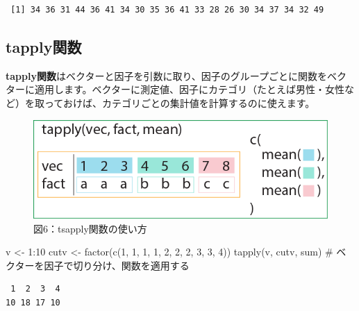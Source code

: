 \documentclass[
  letterpaper,
  DIV=11,
  numbers=noendperiod]{scrreprt}
\newenvironment{Shaded}{\begin{snugshade}}{\end{snugshade}}
\newcommand{\CommentTok}[1]{\textcolor[rgb]{0.37,0.37,0.37}{#1}}
\newcommand{\DecValTok}[1]{\textcolor[rgb]{0.68,0.00,0.00}{#1}}
\newcommand{\FunctionTok}[1]{\textcolor[rgb]{0.28,0.35,0.67}{#1}}
\newcommand{\NormalTok}[1]{\textcolor[rgb]{0.00,0.23,0.31}{#1}}
\newcommand{\OtherTok}[1]{\textcolor[rgb]{0.00,0.23,0.31}{#1}}
\newcommand{\SpecialCharTok}[1]{\textcolor[rgb]{0.37,0.37,0.37}{#1}}
\begin{document}
\begin{verbatim}
 [1] 34 36 31 44 36 41 34 30 35 36 41 33 28 26 30 34 37 34 32 49
\end{verbatim}

\hypertarget{tapplyux95a2ux6570}{%
\subsection{tapply関数}\label{tapplyux95a2ux6570}}

\textbf{tapply関数}はベクターと因子を引数に取り、因子のグループごとに関数をベクターに適用します。ベクターに測定値、因子にカテゴリ（たとえば男性・女性など）を取っておけば、カテゴリごとの集計値を計算するのに使えます。

\begin{figure}

{\centering \includegraphics{././image/chapter15_tapply.png}

}

\caption{図6：tsapply関数の使い方}

\end{figure}

\begin{Shaded}
\begin{Highlighting}[]
\NormalTok{v }\OtherTok{\textless{}{-}} \DecValTok{1}\SpecialCharTok{:}\DecValTok{10}
\NormalTok{cutv }\OtherTok{\textless{}{-}} \FunctionTok{factor}\NormalTok{(}\FunctionTok{c}\NormalTok{(}\DecValTok{1}\NormalTok{, }\DecValTok{1}\NormalTok{, }\DecValTok{1}\NormalTok{, }\DecValTok{1}\NormalTok{, }\DecValTok{2}\NormalTok{, }\DecValTok{2}\NormalTok{, }\DecValTok{2}\NormalTok{, }\DecValTok{3}\NormalTok{, }\DecValTok{3}\NormalTok{, }\DecValTok{4}\NormalTok{))}
\FunctionTok{tapply}\NormalTok{(v, cutv, sum) }\CommentTok{\# ベクターを因子で切り分け、関数を適用する}
\end{Highlighting}
\end{Shaded}

\begin{verbatim}
 1  2  3  4 
10 18 17 10 
\end{verbatim}
\end{document}
